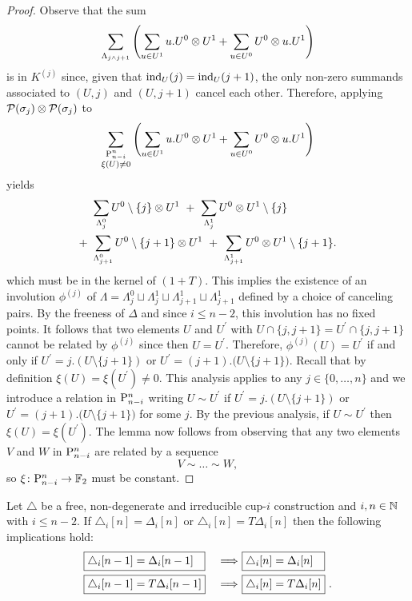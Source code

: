 \begin{proof}
	Observe that the sum
	\[
	\sum_{\Lambda_{j \wedge j+1}} \left( \sum_{u \in U^1} {u.U^0} \ot {U^1} +
	\sum_{u \in U^0} {U^0} \ot {u.U^1} \right)
	\]
	is in $K^{(j)}$ since, given that $\ind_U(j) = \ind_U(j+1)$, the only non-zero summands associated to $(U,j)$ and $(U,j+1)$ cancel each other.
	Therefore, applying $\cP(\sigma_j) \ot \cP(\sigma_j)$ to
	\[
	\sum_{\substack{\P_{n-i}^n \\ \xi(U) \neq 0}} \left(\sum_{u \in U^1} {u.U^0} \ot {U^1} +
	\sum_{u \in U^0} {U^0} \ot {u.U^1} \right)
	\]
	yields
	\begin{align*}
	&\sum_{\Lambda_{j}^0} U^0 \setminus \{j\} \ot {U^1} \ + \
	\sum_{\Lambda_{j}^1} U^0 \ot {U^1} \setminus \{j\} \\ + \
	&\sum_{\Lambda_{j+1}^0} U^0 \setminus \{j+1\} \ot {U^1} \ + \
	\sum_{\Lambda_{j+1}^1} U^0 \ot {U^1} \setminus \{j+1\}.
	\end{align*}
	which must be in the kernel of $(1+T)$.
	This implies the existence of an involution $\phi^{(j)}$ of $\Lambda = \Lambda^0_{j} \sqcup \Lambda^1_{j} \sqcup \Lambda^1_{j+1} \sqcup \Lambda^1_{j+1}$ defined by a choice of canceling pairs.
	By the freeness of $\Delta$ and since $i \leq n-2$, this involution has no fixed points.
	It follows that two elements $U$ and $U^\prime$ with $U \cap \{j, j+1\} = U^\prime \cap \{j, j+1\}$ cannot be related by $\phi^{(j)}$ since then $U = U^\prime$.
	Therefore, $\phi^{(j)}(U) = U^\prime$ if and only if $U^\prime = j.(U \setminus \{j+1\})$ or $U^\prime = (j+1).\big( U \setminus \{j+1\} \big)$.
	Recall that by definition $\xi(U) = \xi(U^\prime) \neq 0$.
	This analysis applies to any $j \in \{0, \dots, n\}$ and we introduce a relation in $\P_{n-i}^n$ writing $U \sim U^\prime$ if $U^\prime = j.(U \setminus \{j+1\})$ or $U^\prime = (j+1).\big( U \setminus \{j+1\} \big)$ for some $j$.
	By the previous analysis, if $U \sim U^\prime$ then $\xi(U) = \xi(U^\prime)$.
	The lemma now follows from observing that any two elements $V$ and $W$ in $\P_{n-i}^n$ are related by a sequence
	\[
	V \sim \dots \sim W,
	\]
	so $\xi \colon \P_{n-i}^n \to \F$ must be constant.
\end{proof}


\begin{lemma} \label{l:second nail}
	Let $\triangle$ be a free, non-degenerate and irreducible cup-$i$ construction and $i,n \in \N$ with $i \leq n-2$.
	If $\triangle_i [n] = \Delta_i [n]$ or $\triangle_i [n] = T \Delta_i [n]$ then the following implications hold:
	\begin{alignat*}{2}
	&\boxed{\triangle_i [n-1] = \Delta_i [n-1] \hspace*{7pt}}\ &\Longrightarrow\
	&\boxed{\triangle_i [n] = \Delta_i [n] \hspace*{7pt}} \\
	&\boxed{\triangle_i [n-1] = T \Delta_i [n-1]}\ &\Longrightarrow\
	&\boxed{\triangle_i [n] = T \Delta_i [n]} \ .
	\end{alignat*}
\end{lemma}

